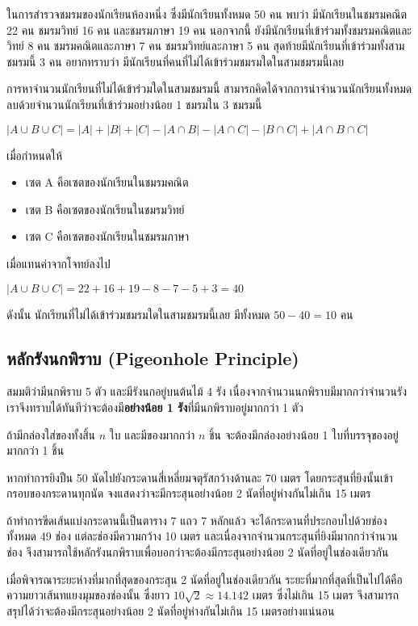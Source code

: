 \newpage

\begin{example}
ในการสำรวจชมรมของนักเรียนห้องหนึ่ง ซึ่งมีนักเรียนทั้งหมด 50 คน พบว่า มีนักเรียนในชมรมคณิต 22 คน ชมรมวิทย์ 16 คน และชมรมภาษา 19 คน นอกจากนี้ ยังมีนักเรียนที่เข้าร่วมทั้งชมรมคณิตและวิทย์ 8 คน ชมรมคณิตและภาษา 7 คน ชมรมวิทย์และภาษา 5 คน สุดท้ายมีนักเรียนที่เข้าร่วมทั้งสามชมรมนี้ 3 คน อยากทราบว่า มีนักเรียนที่คนที่ไม่ได้เข้าร่วมชมรมใดในสามชมรมนี้เลย

การหาจำนวนนักเรียนที่ไม่ได้เข้าร่วมใดในสามชมรมนี้ สามารถคิดได้จากการนำจำนวนนักเรียนทั้งหมดลบด้วยจำนวนนักเรียนที่เข้าร่วมอย่างน้อย 1 ชมรมใน 3 ชมรมนี้
\begin{center}
$|A \cup B \cup C| = |A| + |B| + |C| - |A \cap B| - |A \cap C| - |B \cap C| + |A \cap B \cap C|$
\end{center}
เมื่อกำหนดให้
\begin{itemize}
\item เซต A คือเซตของนักเรียนในชมรมคณิต
\item เซต B คือเซตของนักเรียนในชมรมวิทย์
\item เซต C คือเซตของนักเรียนในชมรมภาษา
\end{itemize}
เมื่อแทนค่าจากโจทย์ลงไป
\begin{center}
$|A \cup B \cup C| = 22 + 16 + 19 - 8 - 7 - 5 + 3 = 40$
\end{center}
ดังนั้น นักเรียนที่ไม่ได้เข้าร่วมชมรมใดในสามชมรมนี้เลย มีทั้งหมด $50-40=10$ คน
\end{example}

\subsection{หลักรังนกพิราบ (Pigeonhole Principle)}

สมมติว่ามีนกพิราบ 5 ตัว และมีรังนกอยู่บนต้นไม้ 4 รัง เนื่องจากจำนวนนกพิราบมีมากกว่าจำนวนรัง เราจึงทราบได้ทันทีว่าจะต้องมี\textbf{อย่างน้อย 1 รัง}ที่มีนกพิราบอยู่มากกว่า 1 ตัว

\begin{theorem}
ถ้ามีกล่องใส่ของทั้งสิ้น $n$ ใบ และมีของมากกว่า $n$ ชิ้น จะต้องมีกล่องอย่างน้อย 1 ใบที่บรรจุของอยู่มากกว่า 1 ชิ้น
\end{theorem}

\begin{example}
หากทำการยิงปืน 50 นัดไปยังกระดานสี่เหลี่ยมจตุรัสกว้างด้านละ 70 เมตร โดยกระสุนที่ยิงนั้นเข้ากรอบของกระดานทุกนัด จงแสดงว่าจะมีกระสุนอย่างน้อย 2 นัดที่อยู่ห่างกันไม่เกิน 15 เมตร

ถ้าทำการขีดเส้นแบ่งกระดานนี้เป็นตาราง 7 แถว 7 หลักแล้ว จะได้กระดานที่ประกอบไปด้วยช่องทั้งหมด 49 ช่อง แต่ละช่องมีความกว้าง 10 เมตร และเนื่องจากจำนวนกระสุนที่ยิงมีมากกว่าจำนวนช่อง จึงสามารถใช้หลักรังนกพิราบเพื่อบอกว่าจะต้องมีกระสุนอย่างน้อย 2 นัดที่อยู่ในช่องเดียวกัน

เมื่อพิจารณาระยะห่างที่มากที่สุดของกระสุน 2 นัดที่อยู่ในช่องเดียวกัน ระยะที่มากที่สุดที่เป็นไปได้คือความยาวเส้นทแยงมุมของช่องนั้น ซึ่งยาว $10\sqrt{2} \approx 14.142$ เมตร ซึ่งไม่เกิน 15 เมตร จึงสามารถสรุปได้ว่าจะต้องมีกระสุนอย่างน้อย 2 นัดที่อยู่ห่างกันไม่เกิน 15 เมตรอย่างแน่นอน  
\end{example}

